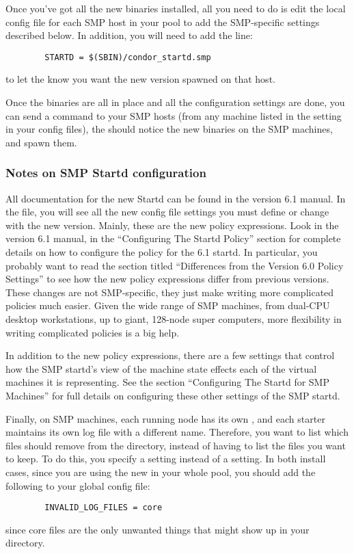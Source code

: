 Once you've got all the new binaries installed, all you need to do is
edit the local config file for each SMP host in your pool to add the 
SMP-specific settings described below.
In addition, you will need to add the line:
\begin{verbatim}
        STARTD = $(SBIN)/condor_startd.smp
\end{verbatim}
to let the  know you want the new version spawned on
that host.

Once the binaries are all in place and all the configuration settings
are done, you can send a  command to your SMP hosts
(from any machine listed in the 
setting in your config files), the  should notice the
new binaries on the SMP machines, and spawn them.

\subsubsection{\label{sec:SMP-config-install}Notes on SMP Startd
configuration} 

All documentation for the new Startd can be found in the version 6.1
manual.  
In the  file, you will see
all the new config file settings you must define or change with the
new version.
Mainly, these are the new policy expressions.  
Look in the version 6.1 manual, in the ``Configuring The Startd
Policy'' section for complete details on how to configure the policy
for the 6.1 startd.
In particular, you probably want to read
the section titled ``Differences from the Version 6.0 Policy
Settings'' to see how the new policy expressions differ from previous
versions. 
These changes are not SMP-specific, they just make writing more
complicated policies much easier.
Given the wide range of SMP machines, from dual-CPU desktop
workstations, up to giant, 128-node super computers, more flexibility
in writing complicated policies is a big help.

In addition to the new policy expressions, there are a few settings
that control how the SMP startd's view of the machine state effects
each of the virtual machines it is representing.  
See the section ``Configuring The Startd for SMP Machines'' for full
details on configuring these other settings of the SMP startd.

Finally, on SMP machines, each running node has its own
, and each starter maintains its own log file with a
different name.
Therefore, you want to list which files  should remove
from the  directory, instead of having to list the files you
want to keep.
To do this, you specify a  setting instead
of a  setting.
In both install cases, since you are using the new  in
your whole pool, you should add the following to your global config
file:
\begin{verbatim}
        INVALID_LOG_FILES = core
\end{verbatim}
since core files are the only unwanted things that might show up in
your  directory. 
